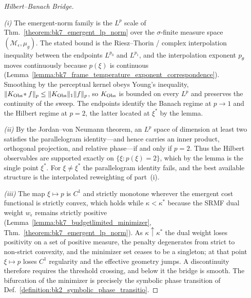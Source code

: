 \begin{proof}[Hilbert--Banach Bridge]
\label{proof:bk7_hilbert_banach_bridge}
\leavevmode

\emph{(i)} The emergent-norm family is the $L^{p}$ scale of
Thm.~\ref{theorem:bk7_emergent_lp_norm} over the $\sigma$-finite measure space
$(\mathcal{M}_{\epsilon},\mu_{g})$. The stated bound is the Riesz--Thorin / complex
interpolation inequality between the endpoints $L^{p_{0}}$ and $L^{p_{1}}$, and the
interpolation exponent $p_{\theta}$ moves continuously because $p(\xi)$ is
continuous (Lemma~\ref{lemma:bk7_frame_temperature_exponent_correspondence}).
Smoothing by the perceptual kernel obeys Young's inequality,
$\lVert K_{\mathrm{Obs}}\!*f\rVert_{p}\le\lVert K_{\mathrm{Obs}}\rVert_{1}\lVert f\rVert_{p}$, so
$K_{\mathrm{Obs}}$ is bounded on every $L^{p}$ and preserves the continuity of the sweep.
The endpoints identify the Banach regime at $p\to 1$ and the Hilbert regime at
$p=2$, the latter located at $\xi^{\ast}$ by the lemma.

\emph{(ii)} By the Jordan--von Neumann theorem, an $L^{p}$ space of dimension at
least two satisfies the parallelogram identity---and hence carries an inner
product, orthogonal projection, and relative phase---if and only if $p=2$. Thus
the Hilbert observables are supported exactly on $\{\xi:p(\xi)=2\}$, which by the
lemma is the single point $\xi^{\ast}$. For $\xi\neq\xi^{\ast}$ the parallelogram
identity fails, and the best available structure is the interpolated reweighting
of part~(i).

\emph{(iii)} The map $\xi\mapsto p$ is $C^{1}$ and strictly monotone wherever the
emergent cost functional is strictly convex, which holds while $\kappa<\kappa^{\ast}$
because the SRMF dual weight $w_{\epsilon}$ remains strictly positive
(Lemma~\ref{lemma:bk7_budgetlimited_minimizer}, Thm.~\ref{theorem:bk7_emergent_lp_norm}).
As $\kappa\uparrow\kappa^{\ast}$ the dual weight loses positivity on a set of
positive measure, the penalty degenerates from strict to non-strict convexity, and
the minimizer set ceases to be a singleton; at that point $\xi\mapsto p$ loses
$C^{1}$ regularity and the effective geometry jumps. A discontinuity therefore
requires the threshold crossing, and below it the bridge is smooth. The bifurcation
of the minimizer is precisely the symbolic phase transition of
Def.~\ref{definition:bk2_symbolic_phase_transitio}.
\end{proof}


